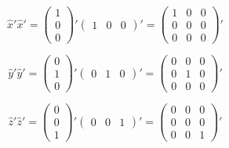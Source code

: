 \documentclass[double,12pt]{beavtex}
\begin{document}
\begin{displaymath}{\hat{x}'\hat{x}'= \left(\begin{array}{c} 1 \\ 0 \\ 0 \end{array}\right)'\left(\begin{array}{ccc} 1 & 0 & 0 \end{array}\right)'=\left(\begin{array}{ccc} 1 & 0 & 0 \\ 0 & 0 & 0 \\ 0 & 0 & 0 \end{array}\right)'}\end{displaymath}

\begin{displaymath}{\hat{y}'\hat{y}'= \left(\begin{array}{c} 0 \\ 1 \\ 0 \end{array}\right)'\left(\begin{array}{ccc} 0 & 1 & 0 \end{array}\right)'=\left(\begin{array}{ccc} 0 & 0 & 0 \\ 0 & 1 & 0 \\ 0 & 0 & 0 \end{array}\right)'}\end{displaymath}

\begin{displaymath}{\hat{z}'\hat{z}'= \left(\begin{array}{c} 0 \\ 0 \\ 1 \end{array}\right)'\left(\begin{array}{ccc} 0 & 0 & 1 \end{array}\right)'=\left(\begin{array}{ccc} 0 & 0 & 0 \\ 0 & 0 & 0 \\ 0 & 0 & 1 \end{array}\right)'}\end{displaymath}
\end{document}

